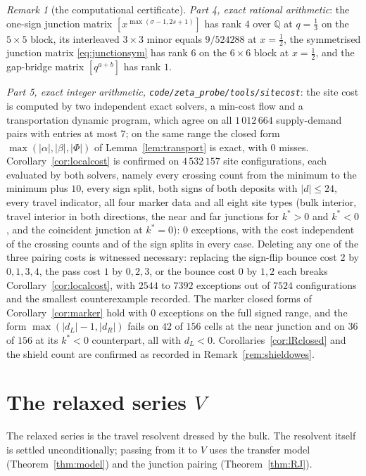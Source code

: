 \documentclass[11pt]{article}
\theoremstyle{plain}
\theoremstyle{definition}
\theoremstyle{remark}
\newtheorem{remark}[theorem]{Remark}
\newcommand{\Q}{\mathbb{Q}}
\begin{document}
\begin{remark}[the computational certificate]
\emph{Part 4, exact rational arithmetic}: the one-sign junction matrix
$[x^{\max(\sigma-1,2s+1)}]$ has rank $4$ over $\Q$ at $q=\tfrac13$ on the $5\times5$ block, its
interleaved $3\times3$ minor equals $9/524288$ at $x=\tfrac12$, the symmetrised junction matrix
\eqref{eq:junctionsym} has rank $6$ on the $6\times6$ block at $x=\tfrac12$, and the gap-bridge
matrix $[q^{a+b}]$ has rank $1$.

\emph{Part 5, exact integer arithmetic, \texttt{code/zeta\_probe/tools/sitecost}}: the site cost is
computed by two independent exact solvers, a min-cost flow and a transportation dynamic program,
which agree on all $1\,012\,664$ supply-demand pairs with entries at most $7$; on the same range the
closed form $\max(|\alpha|,|\beta|,|\Phi|)$ of Lemma~\ref{lem:transport} is exact, with $0$ misses.
Corollary~\ref{cor:localcost} is confirmed on $4\,532\,157$ site configurations, each evaluated by
both solvers, namely every crossing count from the minimum to the minimum plus $10$, every sign
split, both signs of both deposits with $|d|\le24$, every travel indicator, all four marker data and
all eight site types
(bulk interior, travel interior in both directions, the near and far junctions for $k^\ast>0$ and
$k^\ast<0$, and the coincident junction at $k^\ast=0$): $0$ exceptions, with the cost independent of
the crossing counts and of the sign splits in every case. Deleting any one of the three pairing
costs is witnessed necessary: replacing the sign-flip bounce cost $2$ by $0,1,3,4$, the pass cost
$1$ by $0,2,3$, or the bounce cost $0$ by $1,2$ each breaks
Corollary~\ref{cor:localcost}, with $2544$ to $7392$ exceptions out of $7524$ configurations and the
smallest counterexample recorded. The marker closed forms of Corollary~\ref{cor:marker} hold with
$0$ exceptions on the full signed range, and the form $\max(|d_L|-1,|d_R|)$ fails on $42$ of $156$
cells at the near junction and on $36$ of $156$ at its $k^\ast<0$ counterpart, all with $d_L<0$.
Corollaries~\ref{cor:lRclosed} and the shield count are confirmed as recorded in
Remark~\ref{rem:shieldowes}.
\end{remark}

\section{The relaxed series \texorpdfstring{$V$}{V}}\label{sec:V}

The relaxed series is the travel resolvent dressed by the bulk. The resolvent itself is settled
unconditionally; passing from it to $V$ uses the transfer model (Theorem~\ref{thm:model}) and the
junction pairing (Theorem~\ref{thm:RJ}).
\end{document}
